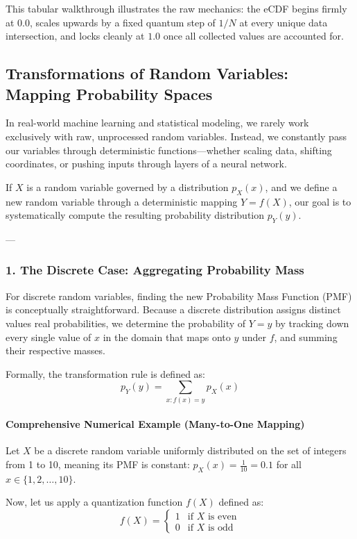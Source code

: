 \documentclass{article}
\begin{document}
This tabular walkthrough illustrates the raw mechanics: the eCDF begins firmly at $0.0$, scales upwards by a fixed quantum step of $1/N$ at every unique data intersection, and locks cleanly at $1.0$ once all collected values are accounted for.

\subsection*{Transformations of Random Variables: Mapping Probability Spaces}

In real-world machine learning and statistical modeling, we rarely work exclusively with raw, unprocessed random variables. Instead, we constantly pass our variables through deterministic functions—whether scaling data, shifting coordinates, or pushing inputs through layers of a neural network. 

If $X$ is a random variable governed by a distribution $p_X(x)$, and we define a new random variable through a deterministic mapping $Y = f(X)$, our goal is to systematically compute the resulting probability distribution $p_Y(y)$.

---

\subsubsection*{1. The Discrete Case: Aggregating Probability Mass}

For discrete random variables, finding the new Probability Mass Function (PMF) is conceptually straightforward. Because a discrete distribution assigns distinct values real probabilities, we determine the probability of $Y = y$ by tracking down every single value of $x$ in the domain that maps onto $y$ under $f$, and summing their respective masses.

Formally, the transformation rule is defined as:
\begin{equation}
p_Y(y) = \sum_{x : f(x) = y} p_X(x) \tag{211}
\end{equation}

\paragraph{Comprehensive Numerical Example (Many-to-One Mapping)}
Let $X$ be a discrete random variable uniformly distributed on the set of integers from 1 to 10, meaning its PMF is constant: $p_X(x) = \frac{1}{10} = 0.1$ for all $x \in \{1, 2, \dots, 10\}$. 

Now, let us apply a quantization function $f(X)$ defined as:
\begin{equation*}
f(X) = 
\begin{cases} 
1 & \text{if } X \text{ is even} \\ 
0 & \text{if } X \text{ is odd} 
\end{cases}
\end{equation*}
\end{document}

